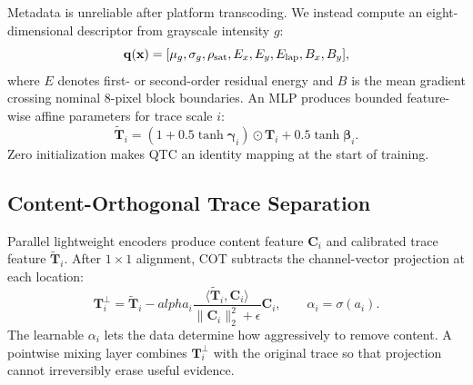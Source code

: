 \documentclass[journal]{IEEEtran}
\begin{document}
Metadata is unreliable after platform transcoding.  We instead compute an
eight-dimensional descriptor from grayscale intensity $g$: 
\begin{equation}
\mathbf q(\mathbf x)=[\mu_g,\sigma_g,\rho_{\rm sat},E_x,E_y,E_{\rm lap},B_x,B_y],
\label{eq:quality}
\end{equation}
where $E$ denotes first- or second-order residual energy and $B$ is the mean
gradient crossing nominal 8-pixel block boundaries.  An MLP produces bounded
feature-wise affine parameters for trace scale $i$:
\begin{equation}
\widetilde{\mathbf T}_i=(1+0.5\tanh\bm\gamma_i)\odot
\mathbf T_i+0.5\tanh\bm\beta_i.
\label{eq:film}
\end{equation}
Zero initialization makes QTC an identity mapping at the start of training.

\subsection{Content-Orthogonal Trace Separation}
Parallel lightweight encoders produce content feature $\mathbf C_i$ and calibrated
trace feature $\widetilde{\mathbf T}_i$.  After $1\!\times\!1$ alignment, COT
subtracts the channel-vector projection at each location:
\begin{equation}
\mathbf T_i^{\perp}=\widetilde{\mathbf T}_i-alpha_i
\frac{\langle\widetilde{\mathbf T}_i,\mathbf C_i\rangle}
{\|\mathbf C_i\|_2^2+\epsilon}\mathbf C_i,
\qquad \alpha_i=\sigma(a_i).
\label{eq:orthogonal}
\end{equation}
The learnable $\alpha_i$ lets the data determine how aggressively to remove
content.  A pointwise mixing layer combines $\mathbf T_i^\perp$ with the original
trace so that projection cannot irreversibly erase useful evidence.
\end{document}
